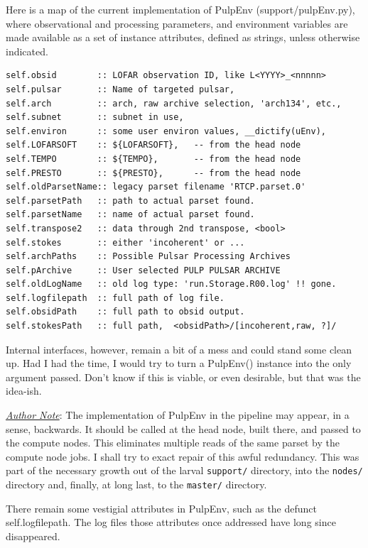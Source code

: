 \documentclass[a4paper,10pt,bibtotoc]{scrartcl}
\begin{document}
Here is a map of the current implementation of PulpEnv (support/pulpEnv.py),
where observational and processing parameters, and environment variables are
made available as a set of instance attributes, defined as strings, unless
otherwise indicated.

\begin{verbatim}self.obsid        :: LOFAR observation ID, like L<YYYY>_<nnnnn>
self.pulsar       :: Name of targeted pulsar,
self.arch         :: arch, raw archive selection, 'arch134', etc.,
self.subnet       :: subnet in use,
self.environ      :: some user environ values, __dictify(uEnv),    
self.LOFARSOFT    :: ${LOFARSOFT},   -- from the head node
self.TEMPO        :: ${TEMPO},       -- from the head node
self.PRESTO       :: ${PRESTO},      -- from the head node
self.oldParsetName:: legacy parset filename 'RTCP.parset.0'
self.parsetPath   :: path to actual parset found.
self.parsetName   :: name of actual parset found.
self.transpose2   :: data through 2nd transpose, <bool>
self.stokes       :: either 'incoherent' or ...
self.archPaths    :: Possible Pulsar Processing Archives
self.pArchive     :: User selected PULP PULSAR ARCHIVE
self.oldLogName   :: old log type: 'run.Storage.R00.log' !! gone.
self.logfilepath  :: full path of log file.
self.obsidPath    :: full path to obsid output.
self.stokesPath   :: full path,  <obsidPath>/[incoherent,raw, ?]/
\end{verbatim}

Internal interfaces, however, remain a bit of a mess and could stand some 
clean up.  Had I had the time, I would try to turn a PulpEnv() instance into 
the only argument passed.  Don't know if this is viable, or even desirable,
but that was the idea-ish.  

\underline{\em{Author Note}}: The implementation of PulpEnv in the pipeline may appear, 
in a sense, backwards.  It should be called at the head node, built there, and passed 
to the compute nodes.  This eliminates multiple reads of the same parset by the compute node jobs. I shall try to exact repair of this awful redundancy.  This was part of the necessary growth out of the larval \verb|support/| directory, into the \verb|nodes/| directory and, finally, at long last, to the \verb|master/| directory.

There remain some vestigial attributes in PulpEnv, such as the defunct self.logfilepath.
The log files those attributes once addressed have long since disappeared.
\end{document}
